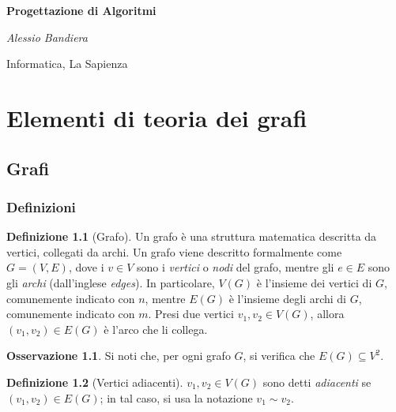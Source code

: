 \documentclass[14pt]{extreport}
\theoremstyle{definition}
\newtheorem{definition}{Definizione}[subsection]
\theoremstyle{definition}
\newtheorem{remark}{Osservazione}[subsection]
\begin{document}
\begin{titlepage}
    \centering
    \vspace*{1cm}

    \textbf{\huge Progettazione di Algoritmi}

    \vspace{1.5cm}

    \textit{\Large Alessio Bandiera}

    \vfill
        
    \large Informatica, La Sapienza
\end{titlepage}


\tableofcontents

\pagebreak



\chapter{Elementi di teoria dei grafi}

\section{Grafi}

\subsection{Definizioni}

\begin{definition}[Grafo]
    Un grafo è una struttura matematica descritta da vertici, collegati da archi. Un grafo viene descritto formalmente come $G=(V, E)$, dove i $v \in V$ sono i \textit{vertici} o \textit{nodi} del grafo, mentre gli $e \in E$ sono gli \textit{archi} (dall'inglese \textit{edges}). In particolare, $V(G)$ è l'insieme dei vertici di $G$, comunemente indicato con $n$, mentre $E(G)$ è l'insieme degli archi di $G$, comunemente indicato con $m$. Presi due vertici $v_1,v_2 \in V(G)$, allora $(v_1, v_2) \in E(G)$ è l'arco che li collega.
\end{definition}

\begin{remark}
    Si noti che, per ogni grafo $G$, si verifica che $E(G) \subseteq V^2$.
\end{remark}

\begin{definition}[Vertici adiacenti]
    $v_1, v_2 \in V(G)$ sono detti \textit{adiacenti} se $(v_1, v_2) \in E(G)$; in tal caso, si usa la notazione $v_1 \sim v_2$.
\end{definition}
\end{document}
